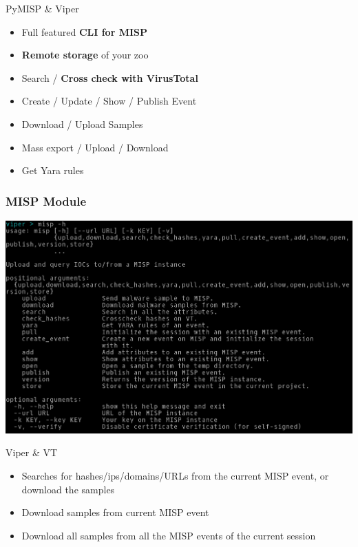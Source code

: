 \begin{frame}[fragile]{PyMISP \& Viper}
    \begin{itemize}
        \item Full featured {\bf CLI for MISP}
        \item {\bf Remote storage} of your zoo
        \item Search / {\bf Cross check with VirusTotal}
        \item Create / Update / Show / Publish Event
        \item Download / Upload Samples
        \item Mass export / Upload / Download
        \item Get Yara rules
    \end{itemize}
\end{frame}

\begin{frame}[fragile]
    \frametitle{MISP Module}
    \includegraphics[scale=0.32]{misp.png}
\end{frame}

\begin{frame}[fragile]{Viper \& VT}
    \begin{itemize}
        \item Searches for hashes/ips/domains/URLs from the current MISP event, or download the samples
        \item Download samples from current MISP event
        \item Download all samples from all the MISP events of the current session
    \end{itemize}
\end{frame}

